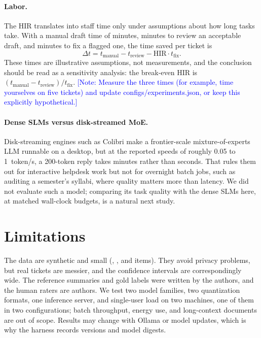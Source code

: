 \documentclass[sigconf,nonacm]{acmart}
\newcommand{\todonote}[1]{\textcolor{blue}{\textsf{[Note: #1]}}}
\newcommand{\todonote}[1]{\errmessage{Author note left in final build: #1}}
\begin{document}
\paragraph{Labor.}
The HIR translates into staff time only under assumptions about how long tasks take.
With a manual draft time of \CostManual{} minutes, \CostReview{} minutes to review an acceptable draft, and \CostFix{} minutes to fix a flagged one, the time saved per ticket is
\begin{equation}
  \Delta t = t_{\text{manual}} - t_{\text{review}} - \text{HIR}\cdot t_{\text{fix}}.
\end{equation}
These times are illustrative assumptions, not measurements, and the conclusion should be read as a sensitivity analysis: the break-even HIR is $(t_{\text{manual}}-t_{\text{review}})/t_{\text{fix}}$.
\todonote{Measure the three times (for example, time yourselves on five tickets) and update configs/experiments.json, or keep this explicitly hypothetical.}

\paragraph{Dense SLMs versus disk-streamed MoE\@.}
Disk-streaming engines such as Colibri make a frontier-scale mixture-of-experts LLM runnable on a desktop, but at the reported speeds of roughly 0.05 to 1~token/s, a 200-token reply takes minutes rather than seconds.
That rules them out for interactive helpdesk work but not for overnight batch jobs, such as auditing a semester's syllabi, where quality matters more than latency.
We did not evaluate such a model; comparing its task quality with the dense SLMs here, at matched wall-clock budgets, is a natural next study.

\section{Limitations}
\label{sec:limitations}
The data are synthetic and small (\NSyllabi{}, \NPolicies{}, \NTickets{} and \NDrafting{} items).
They avoid privacy problems, but real tickets are messier, and the confidence intervals are correspondingly wide.
The reference summaries and gold labels were written by the authors, and the human raters are authors.
We test two model families, two quantization formats, one inference server, and single-user load on two machines, one of them in two configurations; batch throughput, energy use, and long-context documents are out of scope.
Results may change with Ollama or model updates, which is why the harness records versions and model digests.
\end{document}
